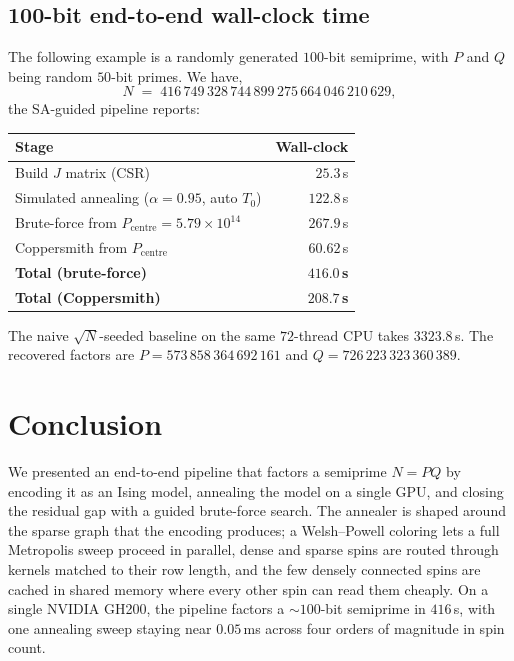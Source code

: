 \documentclass[reprint,twocolumn,amsmath,amssymb,nofootinbib]{revtex4-2}
\begin{document}
\subsection{100-bit end-to-end wall-clock time}

The following example is a randomly generated $100$-bit semiprime, with $P$ and $Q$ being random $50$-bit primes. We have,
\[
  N \;=\; 416\,749\,328\,744\,899\,275\,664\,046\,210\,629,
\]
the SA-guided pipeline reports:
\begin{center}
\begin{tabular}{lr}
  \toprule
  Stage & Wall-clock \\
  \midrule
  Build $J$ matrix (CSR)              & $25.3$\,s \\
  Simulated annealing ($\alpha = 0.95$, auto $T_0$) & $122.8$\,s \\
  \midrule
  Brute-force from $P_{\mathrm{centre}} = 5.79 \times 10^{14}$ & $267.9$\,s \\
  Coppersmith from $P_{\mathrm{centre}}$ & $60.62$\,s \\
  \midrule
  \textbf{Total (brute-force)}        & $\mathbf{416.0}$\,\textbf{s} \\
  \textbf{Total (Coppersmith)}        & $\mathbf{208.7}$\,\textbf{s} \\
  \bottomrule
\end{tabular}
\end{center}
The naive $\sqrt{N}$-seeded baseline on the same $72$-thread CPU takes $3323.8$\,s. The recovered factors are $P = 573\,858\,364\,692\,161$ and $Q = 726\,223\,323\,360\,389$.

\section{Conclusion}\label{sec:conclusion}

We presented an end-to-end pipeline that factors a semiprime $N = PQ$ by encoding it as an Ising model, annealing the model on a single GPU, and closing the residual gap with a guided brute-force search. The annealer is shaped around the sparse graph that the encoding produces; a Welsh--Powell coloring lets a full Metropolis sweep proceed in parallel, dense and sparse spins are routed through kernels matched to their row length, and the few densely connected spins are cached in shared memory where every other spin can read them cheaply. On a single NVIDIA GH200, the pipeline factors a $\sim 100$-bit semiprime in $416$\,s, with one annealing sweep staying near $0.05$\,ms across four orders of magnitude in spin count.
\end{document}
